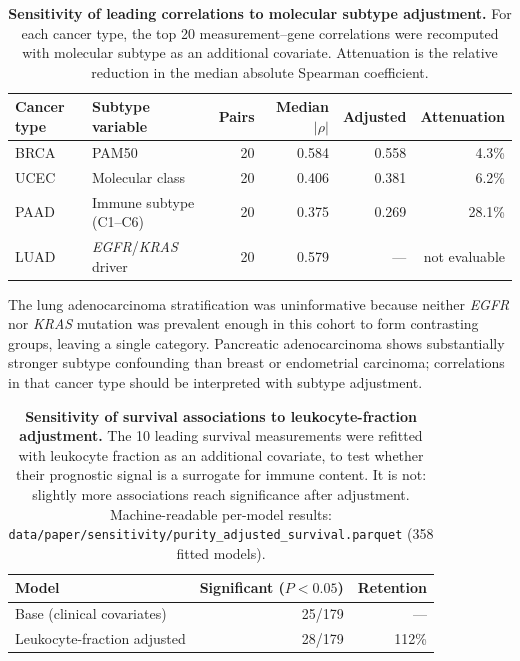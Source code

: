 \documentclass[11pt]{article}
\begin{document}
\begin{table}[htbp]
\centering
\caption{\textbf{Sensitivity of leading correlations to molecular subtype
adjustment.} For each cancer type, the top 20 measurement--gene correlations were
recomputed with molecular subtype as an additional covariate. Attenuation is the
relative reduction in the median absolute Spearman coefficient.}
\label{tab:s12}
\small
\begin{tabular}{llrrrr}
\toprule
Cancer type & Subtype variable & Pairs & Median $|\rho|$ & Adjusted & Attenuation \\
\midrule
BRCA & PAM50 & 20 & 0.584 & 0.558 & 4.3\% \\
UCEC & Molecular class & 20 & 0.406 & 0.381 & 6.2\% \\
PAAD & Immune subtype (C1--C6) & 20 & 0.375 & 0.269 & 28.1\% \\
LUAD & \textit{EGFR}/\textit{KRAS} driver & 20 & 0.579 & --- & not evaluable \\
\bottomrule
\end{tabular}
\par\vspace{0.4em}
\parbox{0.94\textwidth}{\footnotesize The lung adenocarcinoma stratification was
uninformative because neither \textit{EGFR} nor \textit{KRAS} mutation was
prevalent enough in this cohort to form contrasting groups, leaving a single
category. Pancreatic adenocarcinoma shows substantially stronger subtype
confounding than breast or endometrial carcinoma; correlations in that cancer
type should be interpreted with subtype adjustment.}
\end{table}

\begin{table}[htbp]
\centering
\caption{\textbf{Sensitivity of survival associations to leukocyte-fraction
adjustment.} The 10 leading survival measurements were refitted with leukocyte
fraction as an additional covariate, to test whether their prognostic signal is
a surrogate for immune content. It is not: slightly more associations reach
significance after adjustment. Machine-readable per-model results:
\texttt{data/paper/sensitivity/purity\_adjusted\_survival.parquet}
(358 fitted models).}
\label{tab:s13}
\small
\begin{tabular}{lrr}
\toprule
Model & Significant ($P < 0.05$) & Retention \\
\midrule
Base (clinical covariates) & 25/179 & --- \\
Leukocyte-fraction adjusted & 28/179 & 112\% \\
\bottomrule
\end{tabular}
\end{table}
\end{document}
